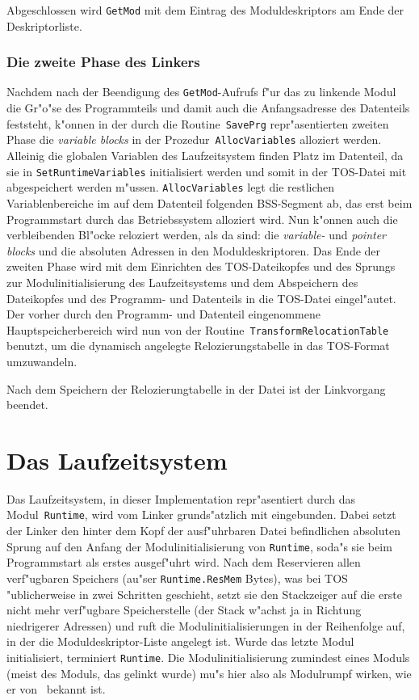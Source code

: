 \medskip
Abgeschlossen wird {\tt GetMod} mit dem Eintrag des Moduldeskriptors am
Ende der Deskriptorliste.

\subsubsection{Die zweite Phase des Linkers}

Nachdem nach der Beendigung des {\tt GetMod}-Aufrufs f"ur das zu linkende
Modul die Gr"o"se des Programmteils und damit auch die Anfangsadresse des
Datenteils feststeht, k"onnen in der durch die Routine~{\tt SavePrg}
repr"asentierten zweiten Phase die {\it variable blocks\/} in der
Prozedur~{\tt AllocVariables} alloziert werden.
Alleinig die globalen Variablen des Laufzeitsystem finden Platz im
Datenteil, da sie in {\tt SetRuntimeVariables} initialisiert werden und
somit in der TOS-Datei mit abgespeichert werden m"ussen.
{\tt AllocVariables} legt die restlichen Variablenbereiche im auf dem
Datenteil folgenden BSS-Segment ab, das erst beim Programmstart durch das
Betriebssystem alloziert wird.
Nun k"onnen auch die verbleibenden Bl"ocke reloziert werden, als da sind:
die {\it variable-} und {\it pointer blocks} und die absoluten Adressen
in den Moduldeskriptoren.
Das Ende der zweiten Phase wird mit dem Einrichten des TOS-Dateikopfes und
des Sprungs zur Modulinitialisierung des Laufzeitsystems und dem
Abspeichern des Dateikopfes und des Programm- und Datenteils in die
TOS-Datei eingel"autet.
Der vorher durch den Programm- und Datenteil eingenommene Hauptspeicherbereich
wird nun von der Routine~{\tt TransformRelocationTable} benutzt, um die
dynamisch angelegte Relozierungstabelle in das TOS-Format umzuwandeln.

Nach dem Speichern der Relozierungtabelle in der Datei ist der Linkvorgang
beendet.


\section{Das Laufzeitsystem}
\label{Laufzeitsystem}

Das Laufzeitsystem, in dieser Implementation repr"asentiert durch das
Modul~{\tt Runtime}, wird vom Linker grunds"atzlich mit eingebunden.
Dabei setzt der Linker den hinter dem Kopf der ausf"uhrbaren Datei
befindlichen absoluten Sprung auf den Anfang der Modulinitialisierung
von {\tt Runtime}, soda"s sie beim Programmstart als erstes ausgef"uhrt
wird.
Nach dem Reservieren allen verf"ugbaren Speichers (au"ser {\tt Runtime.ResMem}
Bytes), was bei TOS "ublicherweise in zwei Schritten geschieht,
setzt sie den Stackzeiger auf die erste nicht mehr verf"ugbare Speicherstelle
(der Stack w"achst ja in Richtung niedrigerer Adressen) und ruft die
Modulinitialisierungen in der Reihenfolge auf, in der die Moduldeskriptor-Liste
angelegt ist.
Wurde das letzte Modul initialisiert, terminiert {\tt Runtime}.
Die Modulinitialisierung zumindest eines Moduls (meist des Moduls, das gelinkt
wurde) mu"s hier also als Modulrumpf wirken, wie er von \modula\ bekannt ist.

